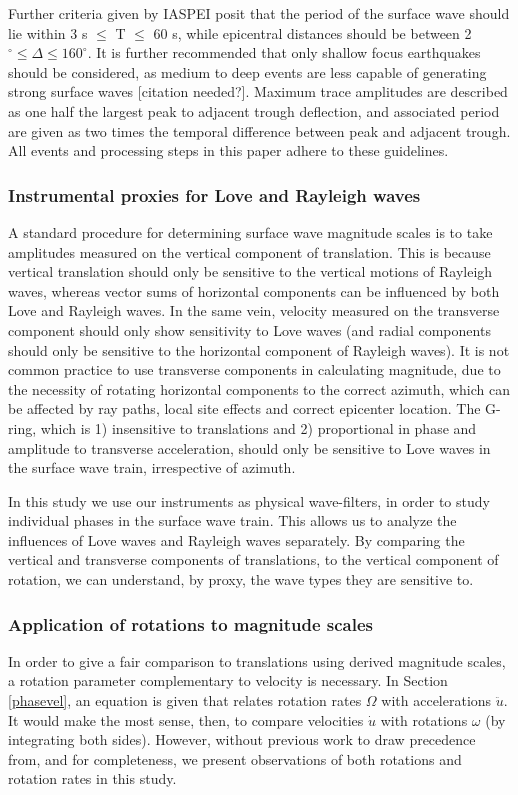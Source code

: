 \documentclass{gji}
\begin{document}
Further criteria given by IASPEI posit that the period of the surface wave should lie within 3 s $\le$ T $\le$ 60 s, while epicentral distances should be between 2$^\circ \le \Delta \le 160^\circ$. It is further recommended that only shallow focus earthquakes should be considered, as medium to deep events are less capable of generating strong surface waves [citation needed?].
Maximum trace amplitudes are described as one half the largest peak to adjacent trough deflection, and associated period are given as two times the temporal difference between peak and adjacent trough. All events and processing steps in this paper adhere to these guidelines.

\subsubsection{Instrumental proxies for Love and Rayleigh waves}\label{proxy}
A standard procedure for determining surface wave magnitude scales is to take amplitudes measured on the vertical component of translation. This is because vertical translation should only be sensitive to the vertical motions of Rayleigh waves, whereas vector sums of horizontal components can be influenced by both Love and Rayleigh waves. In the same vein, velocity measured on the transverse component should only show sensitivity to Love waves (and radial components should only be sensitive to the horizontal component of Rayleigh waves). It is not common practice to use transverse components in calculating magnitude, due to the necessity of rotating horizontal components to the correct azimuth, which can be affected by ray paths, local site effects and correct epicenter location. The G-ring, which is 1) insensitive to translations and 2) proportional in phase and amplitude to transverse acceleration, should only be sensitive to Love waves in the surface wave train, irrespective of azimuth.  

In this study we use our instruments as physical wave-filters, in order to study individual phases in the surface wave train. This allows us to analyze the influences of Love waves and Rayleigh waves separately. By comparing the vertical and transverse components of translations, to the vertical component of rotation, we can understand, by proxy, the wave types they are sensitive to.

\subsubsection{Application of rotations to magnitude scales}
In order to give a fair comparison to translations using derived magnitude scales, a rotation parameter complementary to velocity is necessary. In Section \ref{phasevel}, an equation is given that relates rotation rates $\Omega$ with accelerations $\ddot{u}$. It would make the most sense, then, to compare velocities $\dot{u}$ with rotations $\omega$ (by integrating both sides). However, without previous work to draw precedence from, and for completeness, we present observations of both rotations and rotation rates in this study.
\end{document}
